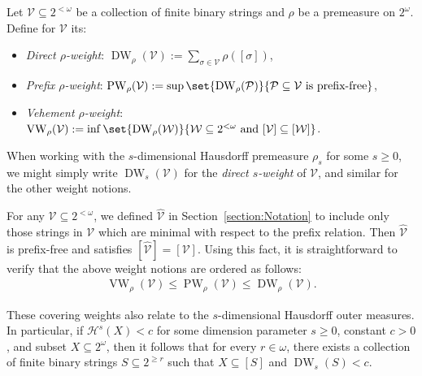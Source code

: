 
\begin{definition}
    Let $\mathcal{V} \subseteq 2^{<\omega}$ be a collection of finite binary strings and $\rho$ be a premeasure on $2^\omega$. Define for $\mathcal{V}$ its:
    \begin{itemize}
        \item \textit{Direct $\rho$-weight}: $\operatorname{DW}_\rho(\mathcal{V}) := \sum_{\sigma \in \mathcal{V}} \rho([\sigma])$,
        \item \textit{Prefix $\rho$-weight}: $\operatorname{PW}_\rho(\mathcal{V}) := \sup \set{\operatorname{DW}_\rho(\mathcal{P})}{\mathcal{P} \subseteq \mathcal{V} \text{ is prefix-free}}$,
        \item \textit{Vehement $\rho$-weight}: $\operatorname{VW}_\rho(\mathcal{V}) := \inf \set{\operatorname{DW}_\rho(\mathcal{W})}{\mathcal{W} \subseteq 2^{< \omega} \text{ and } [\mathcal{V}] \subseteq [\mathcal{W}]}$.
    \end{itemize}
\end{definition}

When working with the $s$-dimensional Hausdorff premeasure $\rho_s$ for some $s \geq 0$, we might simply write $\operatorname{DW}_s(\mathcal{V})$ for the \textit{direct $s$-weight} of $\mathcal{V}$, and similar for the other weight notions.

For any $\mathcal{V} \subseteq 2^{<\omega}$, we defined $\widehat{\mathcal{V}}$ in Section~\ref{section:Notation} to include only those strings in $\mathcal{V}$ which are minimal with respect to the prefix relation. Then $\widehat{\mathcal{V}}$ is prefix-free and satisfies $[\widehat{\mathcal{V}}] = [\mathcal{V}]$. Using this fact, it is straightforward to verify that the above weight notions are ordered as follows:
\begin{align*}
    \operatorname{VW}_\rho(\mathcal{V}) \leq \operatorname{PW}_\rho(\mathcal{V}) \leq  \operatorname{DW}_\rho(\mathcal{V}).
\end{align*}

These covering weights also relate to the $s$-dimensional Hausdorff outer measures. In particular, if $\mathcal{H}^s(X) < c$ for some dimension parameter $s \geq 0$, constant $c > 0$, and subset $X \subseteq 2^\omega$, then it follows that for every $r \in \omega$, there exists a collection of finite binary strings $S \subseteq 2^{\geq r}$ such that $X \subseteq [S]$ and $\operatorname{DW}_s(S) < c$.

